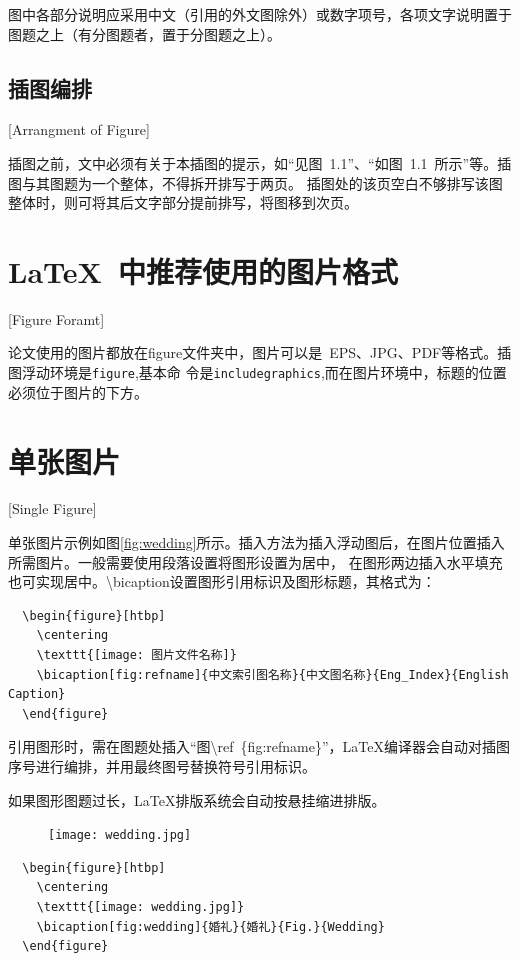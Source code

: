 图中各部分说明应采用中文（引用的外文图除外）或数字项号，各项文字说明置于图题之上（有分图题者，置于分图题之上）。

\subsection{插图编排}[Arrangment of Figure]

插图之前，文中必须有关于本插图的提示，如“见图~1.1”、“如图~1.1~所示”等。插图与其图题为一个整体，不得拆开排写于两页。
插图处的该页空白不够排写该图整体时，则可将其后文字部分提前排写，将图移到次页。

\section{LaTeX~中推荐使用的图片格式}[Figure Foramt]

论文使用的图片都放在figure文件夹中，图片可以是~EPS、JPG、PDF等格式。插图浮动环境是\texttt{figure},基本命
令是\texttt{includegraphics},而在图片环境中，标题的位置必须位于图片的下方。

\section{单张图片}[Single Figure]

单张图片示例如图\ref{fig:wedding}所示。插入方法为插入浮动图后，在图片位置插入所需图片。一般需要使用段落设置将图形设置为居中，
在图形两边插入水平填充也可实现居中。\textbackslash bicaption设置图形引用标识及图形标题，其格式为：

\begin{lstlisting}
  \begin{figure}[htbp]
    \centering
    \texttt{[image: 图片文件名称]}
    \bicaption[fig:refname]{中文索引图名称}{中文图名称}{Eng_Index}{English Caption}
  \end{figure}
\end{lstlisting}

引用图形时，需在图题处插入“图\textbackslash ref~\{fig:refname\}”，\LaTeX{}编译器会自动对插图序号进行编排，并用最终图号替换符号引用标识。

如果图形图题过长，\LaTeX{}排版系统会自动按悬挂缩进排版。

\begin{figure}[htbp]
  \centering
  \texttt{[image: wedding.jpg]}
\end{figure}

\begin{lstlisting}
  \begin{figure}[htbp]
    \centering
    \texttt{[image: wedding.jpg]}
    \bicaption[fig:wedding]{婚礼}{婚礼}{Fig.}{Wedding}
  \end{figure}
\end{lstlisting}

